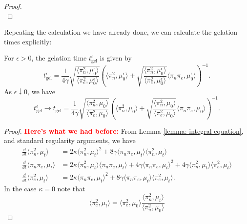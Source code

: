 \begin{proof}
\begin{equation}
    \end{equation} \end{proof}  \iffalse Repeating the calculation we have already done, we can calculate the gelation times explicitly: \begin{lemma}\label{lemma: calculation of gelation} For $\epsilon>0$, the gelation time $t_\mathrm{gel}^\epsilon$ is given by \begin{equation} t_\mathrm{gel}^\epsilon = \frac{1}{4\gamma}\sqrt{\frac{\langle \pi_n^2, \mu_0^\epsilon\rangle}{\langle \pi_e^2, \mu_0^\epsilon\rangle}}\left(\langle \pi_n^2, \mu_0^\epsilon\rangle+\sqrt{\frac{\langle \pi_n^2, \mu_0^\epsilon\rangle}{\langle \pi_e^2, \mu_0^\epsilon\rangle}}\langle \pi_n\pi_e, \mu_0^\epsilon\rangle \right)^{-1}. \end{equation} As $\epsilon \downarrow 0$, we have \begin{equation}
    t_\mathrm{gel}^\epsilon \rightarrow t_\mathrm{gel} =\frac{1}{4\gamma}\sqrt{\frac{\langle \pi_n^2, \mu_0\rangle}{\langle \pi_e^2, \mu_0\rangle}}\left(\langle \pi_n^2, \mu_0\rangle+\sqrt{\frac{\langle \pi_n^2, \mu_0\rangle}{\langle \pi_e^2, \mu_0\rangle}}\langle \pi_n\pi_e, \mu_0\rangle \right)^{-1}.
\end{equation}  \end{lemma} \begin{proof} \textcolor{red}{\textbf{Here's what we had before:}} From Lemma \ref{lemma: integral equation}, and standard regularity arguments, we have 
\begin{align}
    \frac{\dd}{\dd t}\langle \pi_n^2, \mu_t\rangle &=
    2\kappa \langle \pi_n^2, \mu_t\rangle^2
    + 8 \gamma \langle \pi_n \pi_e, \mu_t\rangle\langle \pi_n^2, \mu_t\rangle\\
    \frac{\dd}{\dd t}\langle \pi_n \pi_e, \mu_t\rangle &=
    2\kappa \langle \pi_n^2, \mu_t\rangle \langle \pi_n \pi_e, \mu_t\rangle
    + 4 \gamma \langle \pi_n \pi_e, \mu_t\rangle^2
    + 4 \gamma \langle \pi_n^2, \mu_t\rangle\langle \pi_e^2, \mu_t\rangle\\
    \frac{\dd}{\dd t}\langle \pi_e^2, \mu_t\rangle &=
    2\kappa \langle \pi_n \pi_e, \mu_t\rangle^2
    + 8 \gamma \langle \pi_n \pi_e, \mu_t\rangle\langle \pi_e^2, \mu_t\rangle.
\end{align}
In the case $\kappa = 0$ note that
\begin{equation}\label{eq:proportional}
    \langle \pi_e^2, \mu_t\rangle = \langle \pi_e^2, \mu_0\rangle
    \frac{\langle \pi_n^2, \mu_t\rangle}{\langle \pi_n^2, \mu_0\rangle}

\end{equation}
\end{proof}
